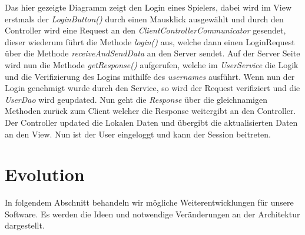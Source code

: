 \documentclass[fontsize=12pt,paper=a4,twoside]{scrartcl}
\begin{document}
Das hier gezeigte Diagramm zeigt den Login eines Spielers, dabei wird im View erstmals der \textit{LoginButton()} durch einen Mausklick ausgewählt und durch den Controller wird eine Request an den \textit{ClientControllerCommunicator} gesendet, dieser wiederum führt die Methode \textit{login()} aus, welche dann einen LoginRequest über die Methode \textit{receiveAndSendData} an den Server sendet. Auf der Server Seite wird nun die Methode \textit{getResponse()} aufgerufen, welche im \textit{UserService} die Logik und die Verifizierung des Logins mithilfe des \textit{usernames} ausführt. Wenn nun der Login genehmigt wurde durch den Service, so wird der Request verifiziert und die \textit{UserDao} wird geupdated. Nun geht die \textit{Response} über die gleichnamigen Methoden zurück zum Client welcher die Response weitergibt an den Controller. Der Controller updated die Lokalen Daten und übergibt die aktualisierten Daten an den View. Nun ist der User eingeloggt und kann der Session beitreten.


\section{Evolution} \label{sec:evolution}


In folgendem Abschnitt behandeln wir mögliche Weiterentwicklungen für unsere Software. Es werden die Ideen und notwendige Veränderungen an der Architektur dargestellt.
\end{document}
